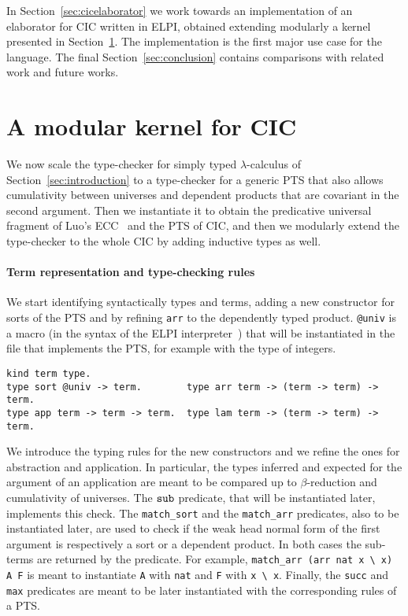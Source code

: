 \documentclass{easychair}
\begin{document}
In Section~\ref{sec:cicelaborator} we work towards an implementation of an elaborator for CIC written in ELPI, obtained extending modularly a kernel presented in Section~\ref{sec:kernel}. The implementation is the first major use case for the language.
The final Section~\ref{sec:conclusion} contains comparisons with related work and future works.

\section{A modular kernel for CIC}\label{sec:kernel}

We now scale the type-checker for simply typed $\lambda$-calculus of Section~\ref{sec:introduction} to a type-checker for a generic PTS that also allows cumulativity between universes and dependent products that are covariant in the second argument. Then we instantiate it to obtain the predicative universal fragment of Luo's ECC~\cite{ecc} and the PTS of CIC, and then we modularly extend the type-checker to the whole CIC by adding inductive types as well.

\paragraph{Term representation and type-checking rules}
We start identifying syntactically types and terms, adding a new constructor for sorts of the PTS and by refining \verb+arr+ to the dependently typed product.
\verb+@univ+ is a macro (in the syntax of the ELPI interpreter~\cite{elpiLPAR}) that will be instantiated in the file that implements the PTS, for example with the type of integers.

\begin{Verbatim}
kind term type.
type sort @univ -> term.        type arr term -> (term -> term) -> term.
type app term -> term -> term.  type lam term -> (term -> term) -> term.
\end{Verbatim}

We introduce the typing rules for the new constructors and we refine the
ones for abstraction and application. In particular, the types inferred and
expected for the argument of an application are meant to be compared up to $\beta$-reduction and cumulativity of universes. The $\verb+sub+$ predicate, that will be instantiated later, implements this check. The \verb+match_sort+ and the \verb+match_arr+ predicates, also to be instantiated later, are used to check if the weak head normal form of the first argument is respectively a sort or a dependent product. In both cases the sub-terms are returned by the predicate. For example, \verb+match_arr (arr nat x \ x) A F+ is meant to instantiate \verb+A+ with \verb+nat+ and \verb+F+ with \verb+x \ x+. Finally, the \verb+succ+ and \verb+max+ predicates are meant to be later instantiated with the corresponding rules of a PTS.
\end{document}
